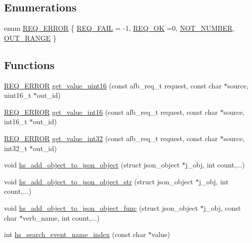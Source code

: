 \subsection*{Enumerations}
\begin{DoxyCompactItemize}
\item 
enum \hyperlink{hs-helper_8h_aa49f1dbbf26f01627a5737cf43aad899}{R\+E\+Q\+\_\+\+E\+R\+R\+OR} \{ \hyperlink{hs-helper_8h_aa49f1dbbf26f01627a5737cf43aad899a96a855966bc63045222b3dcac524cee1}{R\+E\+Q\+\_\+\+F\+A\+IL} = -\/1, 
\hyperlink{hs-helper_8h_aa49f1dbbf26f01627a5737cf43aad899ab093abb14c097b3b7719debb04d5e8ee}{R\+E\+Q\+\_\+\+OK} =0, 
\hyperlink{hs-helper_8h_aa49f1dbbf26f01627a5737cf43aad899aa223eed65c9bee2bf1f4cdecaf90d66a}{N\+O\+T\+\_\+\+N\+U\+M\+B\+ER}, 
\hyperlink{hs-helper_8h_aa49f1dbbf26f01627a5737cf43aad899add1c84bf80c5f80741ee8f37fef1e12b}{O\+U\+T\+\_\+\+R\+A\+N\+GE}
 \}
\end{DoxyCompactItemize}
\subsection*{Functions}
\begin{DoxyCompactItemize}
\item 
\hyperlink{hs-helper_8h_aa49f1dbbf26f01627a5737cf43aad899}{R\+E\+Q\+\_\+\+E\+R\+R\+OR} \hyperlink{hs-helper_8h_aba9ca63f68b1991f8650871f4eae8e0b}{get\+\_\+value\+\_\+uint16} (const afb\+\_\+req\+\_\+t request, const char $\ast$source, uint16\+\_\+t $\ast$out\+\_\+id)
\item 
\hyperlink{hs-helper_8h_aa49f1dbbf26f01627a5737cf43aad899}{R\+E\+Q\+\_\+\+E\+R\+R\+OR} \hyperlink{hs-helper_8h_af3043612cf74bb92cb073e10cacd594a}{get\+\_\+value\+\_\+int16} (const afb\+\_\+req\+\_\+t request, const char $\ast$source, int16\+\_\+t $\ast$out\+\_\+id)
\item 
\hyperlink{hs-helper_8h_aa49f1dbbf26f01627a5737cf43aad899}{R\+E\+Q\+\_\+\+E\+R\+R\+OR} \hyperlink{hs-helper_8h_a8121d965b6fd795c16b8576ab03dcaf1}{get\+\_\+value\+\_\+int32} (const afb\+\_\+req\+\_\+t request, const char $\ast$source, int32\+\_\+t $\ast$out\+\_\+id)
\item 
void \hyperlink{hs-helper_8h_a1ba31a6a94515ff1730ba0043a67d59e}{hs\+\_\+add\+\_\+object\+\_\+to\+\_\+json\+\_\+object} (struct json\+\_\+object $\ast$j\+\_\+obj, int count,...)
\item 
void \hyperlink{hs-helper_8h_a8777c53f1d4d5412f19b134ad85ffedf}{hs\+\_\+add\+\_\+object\+\_\+to\+\_\+json\+\_\+object\+\_\+str} (struct json\+\_\+object $\ast$j\+\_\+obj, int count,...)
\item 
void \hyperlink{hs-helper_8h_ae83604a37134e7bdee3ce4f10bb0b47a}{hs\+\_\+add\+\_\+object\+\_\+to\+\_\+json\+\_\+object\+\_\+func} (struct json\+\_\+object $\ast$j\+\_\+obj, const char $\ast$verb\+\_\+name, int count,...)
\item 
int \hyperlink{hs-helper_8h_a2ff1b894941c3b461ca8119079c4146a}{hs\+\_\+search\+\_\+event\+\_\+name\+\_\+index} (const char $\ast$value)
\end{DoxyCompactItemize}
